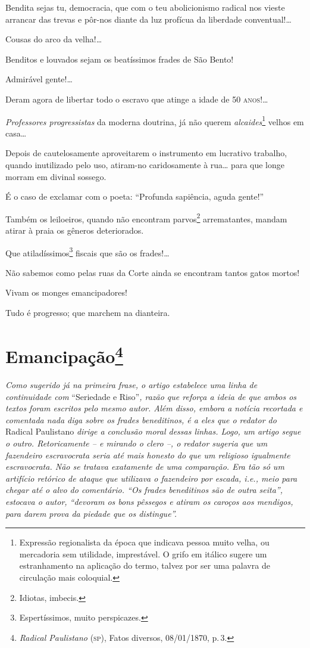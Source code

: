 Bendita sejas tu, democracia, que com o teu abolicionismo radical nos
vieste arrancar das trevas e pôr-nos diante da luz profícua da liberdade
conventual!\ldots{}

Cousas do arco da velha!\ldots{}

Benditos e louvados sejam os beatíssimos frades de São Bento!

Admirável gente!\ldots{}

Deram agora de libertar todo o escravo que atinge a idade de 50 \textsc{anos}!\ldots{}

\emph{Professores progressistas} da moderna doutrina, já não querem
\emph{alcaides}\footnote{ Expressão regionalista da época que indicava
  pessoa muito velha, ou mercadoria sem utilidade, imprestável. O grifo
  em itálico sugere um estranhamento na aplicação do termo, talvez por
  ser uma palavra de circulação mais coloquial.} velhos em casa\ldots{}

Depois de cautelosamente aproveitarem o instrumento em lucrativo
trabalho, quando inutilizado pelo uso, atiram-no caridosamente à rua\ldots{}
para que longe morram em divinal sossego.

É o caso de exclamar com o poeta: ``Profunda sapiência, aguda gente!''

Também os leiloeiros, quando não encontram parvos\footnote{ Idiotas,
  imbecis.} arrematantes, mandam atirar à praia os gêneros deteriorados.

Que atiladíssimos\footnote{ Espertíssimos, muito perspicazes.} fiscais
que são os frades!\ldots{}

Não sabemos como pelas ruas da Corte ainda se encontram tantos gatos
mortos!

Vivam os monges emancipadores!

Tudo é progresso; que marchem na dianteira.

\chapter{Emancipação\footnote{\emph{Radical Paulistano} (\textsc{sp}), Fatos diversos,
  08/01/1870, p.\,3.}} %

\begin{didascalia}
\emph{Como sugerido já na primeira frase, o artigo estabelece uma linha
de continuidade com} ``Seriedade e Riso''\emph{, razão que reforça a ideia
de que ambos os textos foram escritos pelo mesmo autor. Além disso,
embora a notícia recortada e comentada nada diga sobre os frades
beneditinos, é a eles que o redator do} Radical Paulistano \emph{dirige
a conclusão moral dessas linhas. Logo, um artigo segue o outro.
Retoricamente -- e mirando o clero --, o redator sugeria que um
fazendeiro escravocrata seria até mais honesto do que um religioso
igualmente escravocrata. Não se tratava exatamente de uma comparação.
Era tão só um artifício retórico de ataque que utilizava o fazendeiro
por escada, i.e., meio para chegar até o alvo do comentário. ``Os frades
beneditinos são de outra seita'', estocava o autor, ``devoram os bons
pêssegos e atiram os caroços aos mendigos, para darem prova da piedade
que os distingue''.}
\end{didascalia}


